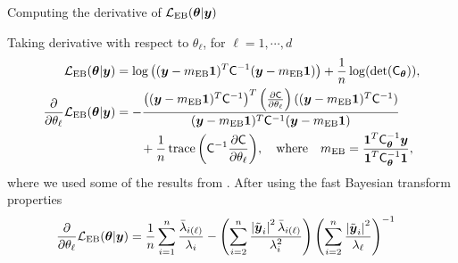 \documentclass[handout, 10pt,compress,xcolor={usenames,dvipsnames}]{beamer} %
\newcommand{\bm}[1]{\boldsymbol{#1}}
\newcommand{\smallcite}[1]{{\small\cite{#1}}}
\newcommand{\MLE}{\textup{EB}}
\newcommand{\mCInv}{\mC^{-1}}
\renewcommand{\vtheta}{{\bm{\theta}}}
\newcommand{\mCthetaInv}{{\mathsf{C}^{-1}_{\vtheta}}}
\def\abs#1{\ensuremath{\left \lvert #1 \right \rvert}}
\begin{document}
\begin{frame}{Computing the derivative of $\mathcal{L}_{\MLE}(\vtheta | \vy)$}

Taking derivative with respect to $\theta_\ell$, for $\ell=1,\cdots,d$
\begin{align*}
\mathcal{L}_{\MLE}(\vtheta | \vy)
& = \log\left( {(\vy-m_\MLE\vone)^T\mCInv(\vy-m_\MLE\vone)} \right) + \frac{1}{n} \log(\det(\mC_\vtheta)),
\\
\frac{\partial}{\partial \theta_\ell} \mathcal{L}_{\MLE}(\vtheta | \vy)
& = - \frac
{\left((\vy-m_\MLE\vone)^T\mCInv\right)^T 
	\left( \frac{\partial \mC}{\partial \theta_\ell} \right)
	((\vy-m_\MLE\vone)^T\mCInv)}
{(\vy-m_\MLE\vone)^T\mCInv(\vy-m_\MLE\vone)}
\\ & \qquad
+ \frac 1n \trace{\left( \mCInv \frac{\partial \mC}{\partial \theta_\ell} \right)}
, \quad \text{where} \quad m_\MLE = \frac{\vone^T \mCthetaInv \vy }{ \vone^T \mCthetaInv \vone}, 
\end{align*}
where we used some of the results from \smallcite{Dong2017a}.  After using the fast Bayesian transform properties
	\begin{align}
	\label{eqn:deriv_obj_func_MLE}
	\frac{\partial}{\partial \theta_\ell} \mathcal{L}_{\MLE}(\vtheta | \vy)
	&=  \frac 1n \sum_{i=1}^{n} \frac{\bar{\lambda}_{i(\ell)}}{\lambda_i}
	- \left({ \sum_{i=2}^n \frac{\abs{\tvy_i}^2 \bar{\lambda}_{i(\ell)}}{\lambda_i^2}}\right)
	\left( {\sum_{i=2}^n \frac{\abs{\tvy_i}^2}{\lambda_\ell}} \right)^{-1}
	\end{align}
              
\end{frame}
\end{document}
